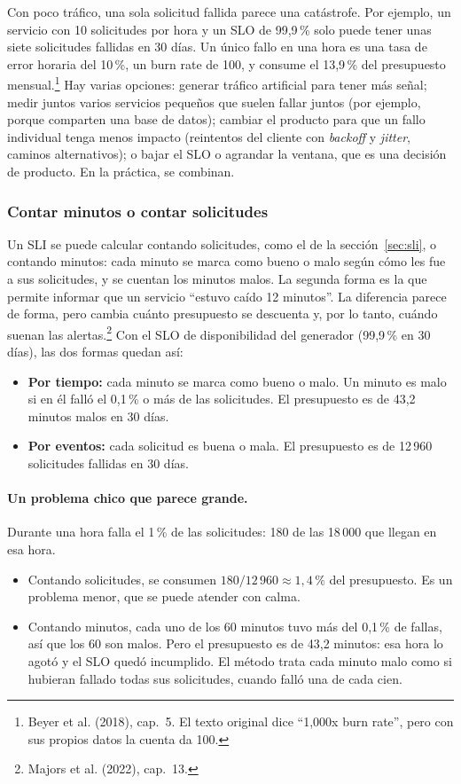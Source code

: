 \documentclass[variant=apuntes,cover=institutional,mode=screen]{ua-engineering-v6-article}
\begin{document}
Con poco tráfico, una sola solicitud fallida parece una catástrofe. Por ejemplo, un servicio con 10 solicitudes por hora y un SLO de 99,9\,\% solo puede tener unas siete solicitudes fallidas en 30 días. Un único fallo en una hora es una tasa de error horaria del 10\,\%, un burn rate de 100, y consume el 13,9\,\% del presupuesto mensual.\footnote{Beyer et al. (2018), cap.~5. El texto original dice ``1,000x burn rate'', pero con sus propios datos la cuenta da 100.} Hay varias opciones: generar tráfico artificial para tener más señal; medir juntos varios servicios pequeños que suelen fallar juntos (por ejemplo, porque comparten una base de datos); cambiar el producto para que un fallo individual tenga menos impacto (reintentos del cliente con \emph{backoff} y \emph{jitter}, caminos alternativos); o bajar el SLO o agrandar la ventana, que es una decisión de producto. En la práctica, se combinan.

\subsubsection{Contar minutos o contar solicitudes}

Un SLI se puede calcular contando solicitudes, como el de la sección~\ref{sec:sli}, o contando minutos: cada minuto se marca como bueno o malo según cómo les fue a sus solicitudes, y se cuentan los minutos malos. La segunda forma es la que permite informar que un servicio ``estuvo caído 12 minutos''. La diferencia parece de forma, pero cambia cuánto presupuesto se descuenta y, por lo tanto, cuándo suenan las alertas.\footnote{Majors et al. (2022), cap.~13.} Con el SLO de disponibilidad del generador (99,9\,\% en 30 días), las dos formas quedan así:

\begin{itemize}
\item \textbf{Por tiempo:} cada minuto se marca como bueno o malo. Un minuto es malo si en él falló el 0,1\,\% o más de las solicitudes. El presupuesto es de 43,2 minutos malos en 30 días.
\item \textbf{Por eventos:} cada solicitud es buena o mala. El presupuesto es de 12\,960 solicitudes fallidas en 30 días.
\end{itemize}

\paragraph{Un problema chico que parece grande.} Durante una hora falla el 1\,\% de las solicitudes: 180 de las 18\,000 que llegan en esa hora.
\begin{itemize}
\item Contando solicitudes, se consumen $180 / 12\,960 \approx 1{,}4\,\%$ del presupuesto. Es un problema menor, que se puede atender con calma.
\item Contando minutos, cada uno de los 60 minutos tuvo más del 0,1\,\% de fallas, así que los 60 son malos. Pero el presupuesto es de 43,2 minutos: esa hora lo agotó y el SLO quedó incumplido. El método trata cada minuto malo como si hubieran fallado todas sus solicitudes, cuando falló una de cada cien.
\end{itemize}
\end{document}
